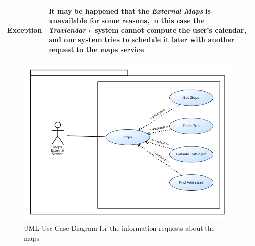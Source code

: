 \begin{table}[H]
\begin{tabular}{|p{3.5cm}|p{10.3cm}|}
    \hline
    \textbf{\large{Exception}} 			& It may be happened that the \emph{External Maps} is unavailable for some reasons, in this case the \emph{Travlendar+} system cannot compute the user's calendar, and our system tries to schedule it later with another request to the maps service\\
    
    \hline
    
    
    \end{tabular}
	
\end{table}

\begin{figure}[H]
\centering
\includegraphics[scale=0.5]{Pictures/UseCaseDiagram/Google.png}
\caption{UML Use Case Diagram for the information requests about the maps}
\end{figure}